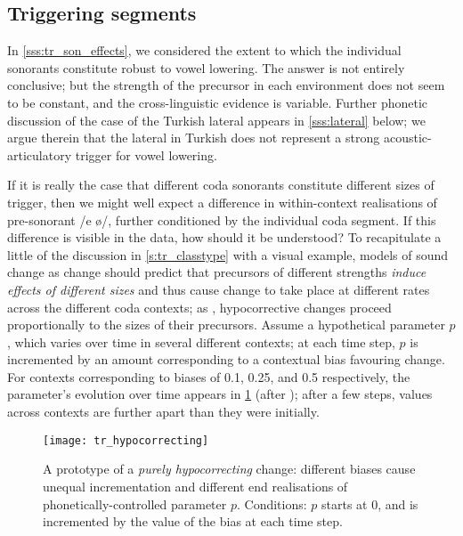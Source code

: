 \subsection{Triggering segments}\label{ss:tr_codas}

In \cref{sss:tr_son_effects}, we considered the extent to which the individual sonorants constitute robust  to vowel lowering. The answer is not entirely conclusive; but the strength of the precursor in each environment does not seem to be constant, and the cross-linguistic evidence is variable. Further phonetic discussion of the case of the Turkish lateral appears in \cref{sss:lateral} below; we argue therein that the lateral in Turkish does not represent a strong acoustic-articulatory trigger for vowel lowering.

If it is really the case that different coda sonorants constitute different sizes of trigger, then we might well expect a difference in within-context realisations of pre-sonorant /e ø/, further conditioned by the individual coda segment. If this difference is visible in the data, how should it be understood? To recapitulate a little of the discussion in \cref{s:tr_classtype} with a visual example, models of sound change as  change \citep{Ohala1981} should predict that precursors of different strengths \emph{induce effects of different sizes} and thus cause change to take place at different rates across the different coda contexts; as \citet{Fruehwald2016}, hypocorrective changes proceed proportionally to the sizes of their precursors. Assume a hypothetical parameter $p$, which varies over time in several different contexts; at each time step, $p$ is incremented by an amount corresponding to a contextual bias favouring change. For contexts corresponding to biases of 0.1, 0.25, and 0.5 respectively, the parameter's evolution over time appears in \cref{fig:tr_hypo_example} (after \citealt[378]{Fruehwald2016}); after a few steps, values across contexts are further apart than they were initially.

\begin{figure}[ht]
  \centering
  \texttt{[image: tr\_hypocorrecting]}
  \caption[A rough illustration of hypocorrection.]{A prototype of a \emph{purely hypocorrecting} change: different biases cause unequal incrementation and different end realisations of phonetically-controlled parameter $p$. Conditions: $p$ starts at 0, and is incremented by the value of the bias at each time step. }
  \label{fig:tr_hypo_example}
\end{figure}

